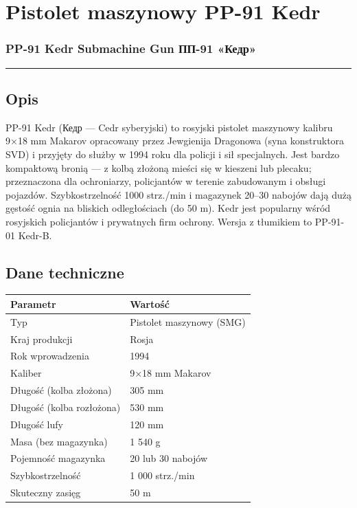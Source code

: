 \documentclass[12pt,openany,oneside]{book}
\begin{document}
\chapter{Pistolet maszynowy PP-91
Kedr}\label{pistolet-maszynowy-pp-91-kedr}

\subsection{PP-91 Kedr Submachine Gun \textbar{} ПП-91
«Кедр»}\label{pp-91-kedr-submachine-gun-ux43fux43f-91-ux43aux435ux434ux440}

\begin{center}\rule{0.5\linewidth}{0.5pt}\end{center}

\section{Opis}\label{opis-96}

PP-91 Kedr (Кедр --- Cedr syberyjski) to rosyjski pistolet maszynowy
kalibru 9×18 mm Makarov opracowany przez Jewgienija Dragonowa (syna
konstruktora SVD) i przyjęty do służby w 1994 roku dla policji i sił
specjalnych. Jest bardzo kompaktową bronią --- z kolbą złożoną mieści
się w kieszeni lub plecaku; przeznaczona dla ochroniarzy, policjantów w
terenie zabudowanym i obsługi pojazdów. Szybkostrzelność 1000 strz./min
i magazynek 20--30 nabojów dają dużą gęstość ognia na bliskich
odległościach (do 50 m). Kedr jest popularny wśród rosyjskich
policjantów i prywatnych firm ochrony. Wersja z tłumikiem to PP-91-01
Kedr-B.

\section{Dane techniczne}\label{dane-techniczne-96}

\begin{longtable}[]{@{}ll@{}}
\toprule\noalign{}
Parametr & Wartość \\
\midrule\noalign{}
\endhead
\bottomrule\noalign{}
\endlastfoot
Typ & Pistolet maszynowy (SMG) \\
Kraj produkcji & Rosja \\
Rok wprowadzenia & 1994 \\
Kaliber & 9×18 mm Makarov \\
Długość (kolba złożona) & 305 mm \\
Długość (kolba rozłożona) & 530 mm \\
Długość lufy & 120 mm \\
Masa (bez magazynka) & 1 540 g \\
Pojemność magazynka & 20 lub 30 nabojów \\
Szybkostrzelność & 1 000 strz./min \\
Skuteczny zasięg & 50 m \\
\end{longtable}
\end{document}
